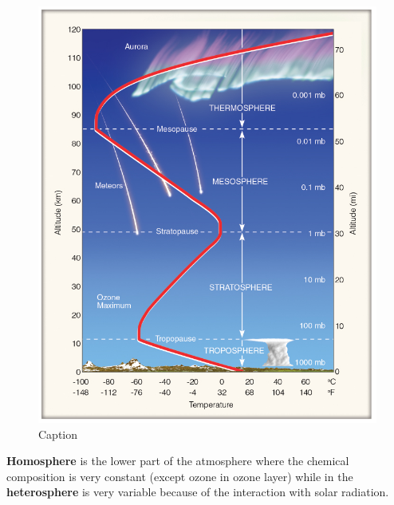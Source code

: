 \documentclass[12pt,oneside]{book}
\begin{document}
\begin{figure}

{\centering \includegraphics[width=0.8\linewidth]{figures/Figure13} 

}

\caption{Caption}\label{fig:Layer2}
\end{figure}

\textbf{Homosphere} is the lower part of the atmosphere where the
chemical composition is very constant (except ozone in ozone layer)
while in the \textbf{heterosphere} is very variable because of the
interaction with solar radiation.
\end{document}
